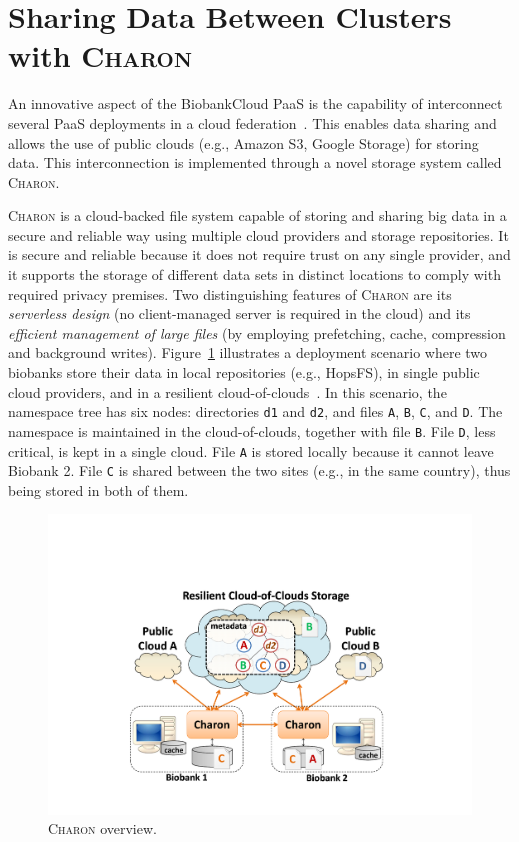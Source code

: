 \section{Sharing Data Between Clusters with \textsc{Charon}}

An innovative aspect of the BiobankCloud PaaS is the capability of interconnect several PaaS deployments in a cloud federation~\cite{ebb13}. This enables data sharing and allows the use of public clouds (e.g., Amazon S3, Google Storage) for storing data. This interconnection is implemented through a novel storage system called \textsc{Charon}.

\textsc{Charon} is a cloud-backed file system capable of storing and sharing big data in a secure and reliable way using multiple cloud providers and storage repositories. It is secure and reliable because it does not require trust on any single provider, and it supports the storage of different data sets in distinct locations to comply with required privacy premises. Two distinguishing features of \textsc{Charon} are its \emph{serverless design} (no client-managed server is required in the cloud) and its \emph{efficient management of large files} (by employing prefetching, cache, compression and background writes).
Figure~\ref{fig:charon} illustrates a deployment scenario where two biobanks store their data in local repositories (e.g., HopsFS), in single public cloud providers, and in a resilient cloud-of-clouds~\cite{depsky13}. In this scenario, the namespace tree has six nodes: directories \texttt{d1} and \texttt{d2}, and files \texttt{A}, \texttt{B}, \texttt{C}, and \texttt{D}. 
The namespace is maintained in the cloud-of-clouds, together with file \texttt{B}.
File \texttt{D}, less critical, is kept in a single cloud.
File \texttt{A} is stored locally because it cannot leave Biobank 2.
File \texttt{C} is shared between the two sites (e.g., in the same country), thus being stored in both of them.

\begin{figure}[ht]
 \centering
 \includegraphics[width=0.5\columnwidth]{./imgs/charon_arch.pdf}
\caption{\small \textsc{Charon} overview.}
\label{fig:charon}
\end{figure}
